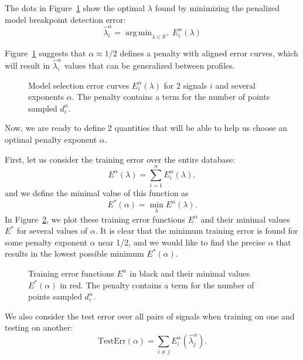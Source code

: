 \documentclass{jsfds} %
\newcommand{\fig}[3][H]{
  \begin{figure}[#1]
    \hskip -1cm
    
    \caption{#3}
    \label{fig:#2}
  \end{figure}
}
\DeclareMathOperator*{\argmin}{arg\,min}
\newcommand{\RR}{\mathbb{R}}
\begin{document}
The dots in Figure~\ref{fig:variable-density-berr} show the optimal
$\lambda$ found by minimizing the penalized model breakpoint detection
error:
\begin{equation}
  \label{eq:lambda_hat}
  \hat \lambda^\alpha_i = \argmin_{\lambda\in\RR^+}  E^\alpha_i(\lambda)
\end{equation}

Figure~\ref{fig:variable-density-berr} suggests that $\alpha\approx1/2$
defines a penalty with aligned error curves, which will result in
$\hat \lambda_i^\alpha$ values that can be generalized between
profiles. 

\fig{variable-density-berr}{Model selection error curves
  $E_i^\alpha(\lambda)$ for 2 signals $i$ and several exponents
  $\alpha$. The penalty contains a term for the number of points sampled $d_i^\alpha$.}

\newpage

Now, we are ready to define 2 quantities that will be able to help us
choose an optimal penalty exponent $\alpha$.

First, let us consider the training error over the entire database:
\begin{equation}
  \label{eq:lerr_train}
  E^\alpha(\lambda) = \sum_{i=1}^n E_i^\alpha(\lambda),
\end{equation}
and we define the minimal value of this function as
\begin{equation}
  \label{eq:lerr_train_min}
  E^*(\alpha) = \min_\lambda E^\alpha(\lambda).
\end{equation}
In Figure~\ref{fig:variable-density-error-train}, we plot these
training error functions $E^\alpha$ and their minimal values $E^*$ for
several values of $\alpha$. It is clear that the minimum training
error is found for some penalty exponent $\alpha$ near 1/2, and we
would like to find the precise $\alpha$ that results in the lowest
possible minimum $E^*(\alpha)$.

\fig{variable-density-error-train}{Training error functions $E^\alpha$
  in black and their minimal values $E^*(\alpha)$ in red. The penalty
  contains a term for the number of points sampled $d_i^\alpha$.}

\newpage

We also consider the test error over all pairs of signals when
training on one and testing on another:
\begin{equation}
  \label{eq:lerr_test}
  \text{TestErr}(\alpha) = 
\sum_{i\neq j} E^\alpha_i(\hat \lambda_j^\alpha).
\end{equation}
\end{document}
